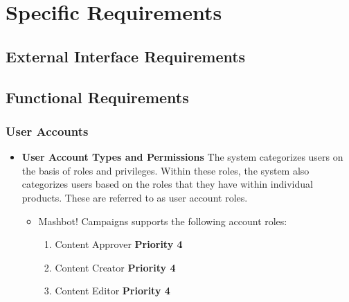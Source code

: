 \documentclass{report}
\begin{document}
\section{Specific Requirements}
	\subsection{External Interface Requirements}
	\subsection{Functional Requirements}
		\subsubsection{User Accounts} %
			\begin{itemize}
				\item \textbf{User Account Types and Permissions} The system categorizes users on the basis
				of roles and privileges. Within these roles, the system also categorizes users based on
			 	the roles that they have within individual products.	These are referred to as user 
				account roles.
				\begin{itemize}
					\item Mashbot! Campaigns supports the following account roles:
						\begin{enumerate}
							\item Content Approver \textbf{Priority 4} 
							\item Content Creator \textbf{Priority 4} 
							\item Content Editor \textbf{Priority 4} 
							

\end{enumerate}
\end{itemize}
\end{itemize}
\end{document}
